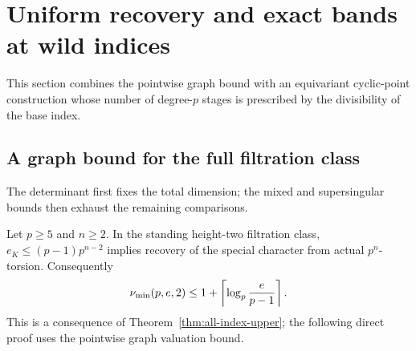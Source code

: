 \section{Uniform recovery and exact bands at wild indices}\label{sec:all-wild-indices}
This section combines the pointwise graph bound with an equivariant cyclic-point construction whose number of degree-$p$ stages is prescribed by the divisibility of the base index.

\subsection{A graph bound for the full filtration class}
The determinant first fixes the total dimension; the mixed and supersingular bounds then exhaust the remaining comparisons.

\begin{proposition}\label{prop:graph-uniform-full}
Let $p\ge5$ and $n\ge2$. In the standing height-two filtration class, $e_K\le(p-1)p^{n-2}$ implies recovery of the special character from actual $p^n$-torsion. Consequently
\[
 \nu_{\min}(p,e,2)\le1+\left\lceil\log_p\frac{e}{p-1}\right\rceil.
\]
This is a consequence of Theorem~\ref{thm:all-index-upper}; the following direct proof uses the pointwise graph valuation bound.
\end{proposition}
